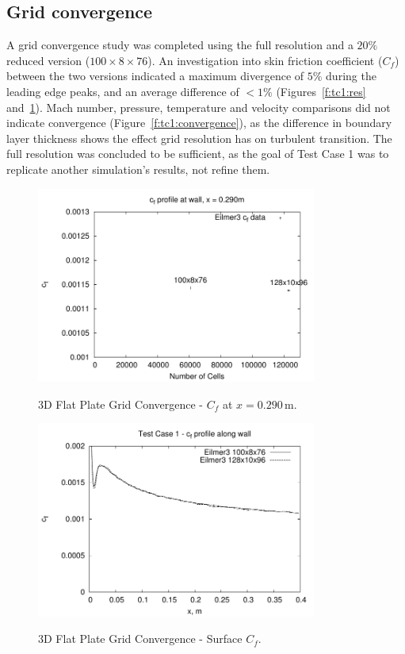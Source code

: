 \subsection{Grid convergence}
A grid convergence study was completed using the full resolution and a $20\%$ reduced version ($100\times8\times76$). An investigation into skin friction coefficient ($C_f$) between the two versions indicated a maximum divergence of $5\%$ during the leading edge peaks, and an average difference of $<1\%$ (Figures~\ref{f:tc1:res} and~\ref{f:tc1:comp}). Mach number, pressure, temperature and velocity comparisons did not indicate convergence (Figure~\ref{f:tc1:convergence}), as the difference in boundary layer thickness shows the effect grid resolution has on turbulent transition. The full resolution was concluded to be sufficient, as the goal of Test Case 1 was to replicate another simulation's results, not refine them. 
%
\begin{figure}[h]
 \begin{center}
  \includegraphics[width=9.2cm]{./chap6-3Dflatplate/figs/gridconverge/tc1-cf-resolution.pdf}
  \caption{3D Flat Plate Grid Convergence - $C_f$ at $x=0.290$\,m.}
  \label{f:tc1:res}
  \vspace{1cm}
  \includegraphics[width=9.2cm]{./chap6-3Dflatplate/figs/gridconverge/tc1-cf-comparison.pdf}
  \caption{3D Flat Plate Grid Convergence - Surface $C_f$.}
  \label{f:tc1:comp}
 \end{center}
\end{figure}
